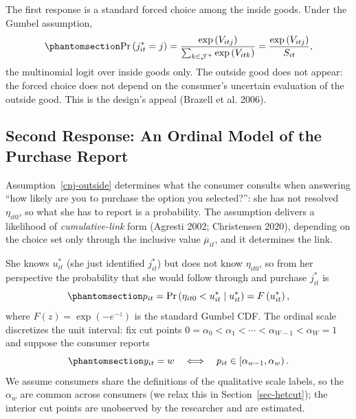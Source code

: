 \documentclass[
  letterpaper,
  DIV=11,
  numbers=noendperiod]{scrartcl}
\theoremstyle{plain}
\theoremstyle{plain}
\theoremstyle{plain}
\theoremstyle{remark}
\begin{document}
The first response is a standard forced choice among the inside goods.
Under the Gumbel assumption,
\begin{equation}\protect\phantomsection\label{eq-mnl}{
\Pr \left( j^*_{it} = j \right)
= \frac{\exp \left( V_{itj} \right)}{\sum_{k\in\mathcal{J}^{+}} \exp \left( V_{itk} \right)}
= \frac{\exp \left( V_{itj} \right)}{S_{it}},
}\end{equation} the multinomial logit over inside goods only. The
outside good does not appear: the forced choice does not depend on the
consumer's uncertain evaluation of the outside good. This is the
design's appeal (Brazell et al. 2006).

\subsection{Second Response: An Ordinal Model of the Purchase
Report}\label{second-response-an-ordinal-model-of-the-purchase-report}

Assumption~\ref{cnj-outside} determines what the consumer consults when
answering ``how likely are you to purchase the option you selected?'':
she has not resolved \(\eta_{it0}\), so what she has to report is a
probability. The assumption delivers a likelihood of
\emph{cumulative-link} form (Agresti 2002; Christensen 2020), depending
on the choice set only through the inclusive value
\(\overline{\mu}_{it}\), and it determines the link.

She knows \(u^*_{it}\) (she just identified \(j^*_{it}\)) but does not
know \(\eta_{it0}\), so from her perspective the probability that she
would follow through and purchase \(j^*_{it}\) is
\begin{equation}\protect\phantomsection\label{eq-purchprob}{
p_{it} = \Pr \left( \eta_{it0} < u^*_{it} \mid u^*_{it} \right) = F\left( u^*_{it} \right),
}\end{equation} where \(F(z) = \exp(-e^{-z})\) is the standard Gumbel
CDF. The ordinal scale discretizes the unit interval: fix cut points
\(0 = \alpha_0 < \alpha_1 < \cdots < \alpha_{W-1} < \alpha_W = 1\) and
suppose the consumer reports
\begin{equation}\protect\phantomsection\label{eq-reportrule}{
y_{it} = w
\quad \Longleftrightarrow \quad
p_{it} \in \left[ \alpha_{w-1}, \alpha_w \right).
}\end{equation} We assume consumers share the definitions of the
qualitative scale labels, so the \(\alpha_w\) are common across
consumers (we relax this in Section~\ref{sec-hetcut}); the interior cut
points are unobserved by the researcher and are estimated.
\end{document}
